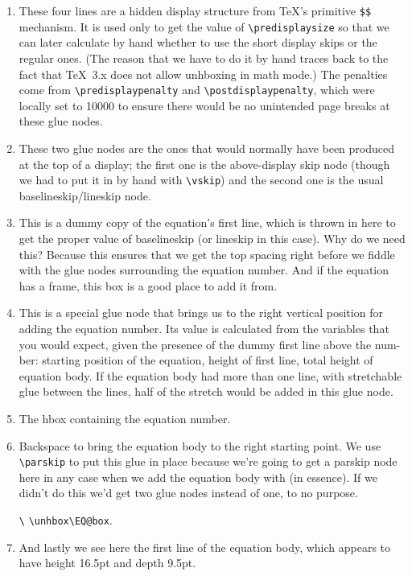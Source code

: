 \documentclass{article}
\providecommand*\cs[1]{\texttt{\textbackslash#1}}
\begin{document}
\begin{enumerate}
\item These four lines are a hidden display structure from \TeX's
  primitive \texttt{\$\$} mechanism. It is used only to get the value
  of \cs{predisplaysize} so that we can later calculate by hand
  whether to use the short display skips or the regular ones. (The
  reason that we have to do it by hand traces back to the fact that
  \TeX\ 3.x does not allow unhboxing in math mode.) The penalties come
  from \cs{predisplaypenalty} and \cs{postdisplaypenalty}, which were
  locally set to 10000 to ensure there would be no unintended page
  breaks at these glue nodes.

\item These two glue nodes are the ones that would normally have been
  produced at the top of a display; the first one is the above-display
  skip node (though we had to put it in by hand with \cs{vskip}) and
  the second one is the usual baselineskip/lineskip node.

\item This is a dummy copy of the equation's first line, which is
  thrown in here to get the proper value of baselineskip (or lineskip
  in this case). Why do we need this? Because this ensures that we get
  the top spacing right before we fiddle with the glue nodes
  surrounding the equation number. And if the equation has a frame,
  this box is a good place to add it from.

\item This is a special glue node that brings us to the right vertical
  position for adding the equation number. Its value is calculated
  from the variables that you would expect, given the presence of the
  dummy first line above the num- ber: starting position of the
  equation, height of first line, total height of equation body. If
  the equation body had more than one line, with stretchable glue
  between the lines, half of the stretch would be added in this glue
  node.

\item The hbox containing the equation number.

\item Backspace to bring the equation body to the right starting point. We use 
  \cs{parskip} to put this glue in place because we're going to get a
  parskip node here in any case when we add the equation body with (in
  essence). If we didn't do this we'd get two glue nodes instead of
  one, to no purpose.

\cs{\noindent} \cs{unhbox}\cs{EQ@box}.


\item And lastly we see here the first line of the equation body,
  which appears to have height 16.5pt and depth 9.5pt.
\end{enumerate}
\end{document}
